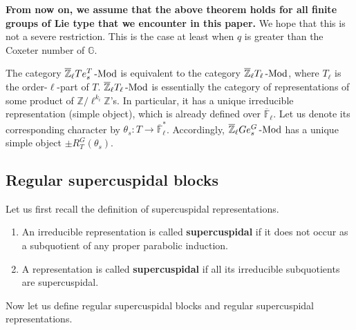 		\textbf{From now on, we assume that the above theorem holds for all finite groups of Lie type that we encounter in this paper.} We hope that this is not a severe restriction. This is the case at least when $q$ is greater than the Coxeter number of $\mathbb{G}$.
		
		\begin{remark}\label{Remark: T_{ell}}
			The category $\overline{\mathbb{Z}}_{\ell}Te_s^T\operatorname{-Mod}$ is equivalent to the category $\overline{\mathbb{Z}}_{\ell}T_{\ell}\operatorname{-Mod}$, where $T_{\ell}$ is the order-$\ell$-part of $T$. $\overline{\mathbb{Z}}_{\ell}T_{\ell}\operatorname{-Mod}$ is essentially the category of representations of some product of $\mathbb{Z}/\ell^{k_i}\mathbb{Z}$'s. In particular, it has a unique irreducible representation (simple object), which is already defined over $\overline{\mathbb{F}}_{\ell}$. Let us denote its corresponding character by $\theta_s: T \to \overline{\mathbb{F}}_{\ell}^*$. Accordingly, $\overline{\mathbb{Z}}_{\ell}Ge_s^G\operatorname{-Mod}$ has a unique simple object $\pm R_T^G(\theta_s)$.
		\end{remark}
		
		

		\subsection{Regular supercuspidal blocks}
		
		Let us first recall the definition of supercuspidal representations.
		
		\begin{definition}\label{Def supercuspidal}
			
			\begin{enumerate}
				\item An irreducible representation is called \textbf{supercuspidal} if it does not occur as a subquotient of any proper parabolic induction.
				\item A representation is called \textbf{supercuspidal} if all its irreducible subquotients are supercuspidal.
			\end{enumerate}
		\end{definition}
		
		Now let us define regular supercuspidal blocks and regular supercuspidal representations.
		
